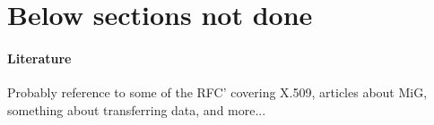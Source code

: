 \documentclass[paper=a4, fontsize=11pt]{scrartcl} %
\numberwithin{equation}{section} %
\numberwithin{figure}{section} %
\numberwithin{table}{section} %
\begin{document}
\section{Below sections not done}

\paragraph{Literature}
Probably reference to some of the RFC' covering X.509, articles about MiG,
something about transferring data, and more...




\end{document}
